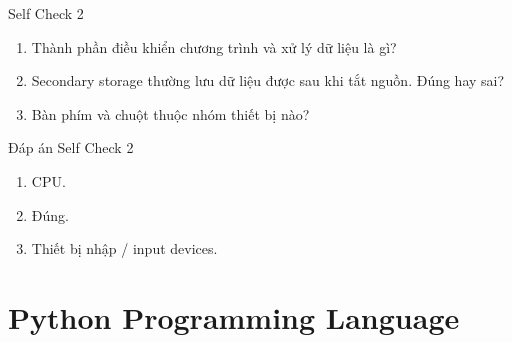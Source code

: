 \documentclass[aspectratio=169,10pt]{beamer}
\begin{document}
\begin{frame}{Self Check 2}
\begin{enumerate}
  \item Thành phần điều khiển chương trình và xử lý dữ liệu là gì?
  \item Secondary storage thường lưu dữ liệu được sau khi tắt nguồn. Đúng hay sai?
  \item Bàn phím và chuột thuộc nhóm thiết bị nào?
\end{enumerate}
\end{frame}

\begin{frame}{Đáp án Self Check 2}
\begin{enumerate}
  \item CPU.
  \item Đúng.
  \item Thiết bị nhập / input devices.
\end{enumerate}
\end{frame}

\section{Python Programming Language}
\end{document}

